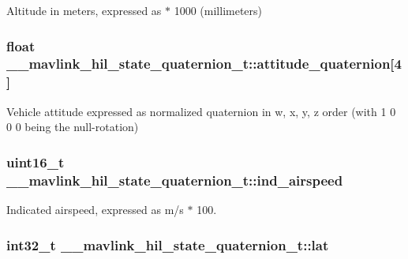 Altitude in meters, expressed as $\ast$ 1000 (millimeters) 

\hypertarget{struct____mavlink__hil__state__quaternion__t_a3abb35174edc949c96d493a40a0c0ff2}{
\subsubsection[{attitude\+\_\+quaternion}]{\setlength{\rightskip}{0pt plus 5cm}float \+\_\+\+\_\+mavlink\+\_\+hil\+\_\+state\+\_\+quaternion\+\_\+t\+::attitude\+\_\+quaternion\mbox{[}4\mbox{]}}}\label{struct____mavlink__hil__state__quaternion__t_a3abb35174edc949c96d493a40a0c0ff2}


Vehicle attitude expressed as normalized quaternion in w, x, y, z order (with 1 0 0 0 being the null-\/rotation) 

\hypertarget{struct____mavlink__hil__state__quaternion__t_a78c835fba2a49d66fd73d745d347fac5}{
\subsubsection[{ind\+\_\+airspeed}]{\setlength{\rightskip}{0pt plus 5cm}uint16\+\_\+t \+\_\+\+\_\+mavlink\+\_\+hil\+\_\+state\+\_\+quaternion\+\_\+t\+::ind\+\_\+airspeed}}\label{struct____mavlink__hil__state__quaternion__t_a78c835fba2a49d66fd73d745d347fac5}


Indicated airspeed, expressed as m/s $\ast$ 100. 

\hypertarget{struct____mavlink__hil__state__quaternion__t_a2e54416e81eb004268570f4250242356}{
\subsubsection[{lat}]{\setlength{\rightskip}{0pt plus 5cm}int32\+\_\+t \+\_\+\+\_\+mavlink\+\_\+hil\+\_\+state\+\_\+quaternion\+\_\+t\+::lat}}\label{struct____mavlink__hil__state__quaternion__t_a2e54416e81eb004268570f4250242356}



